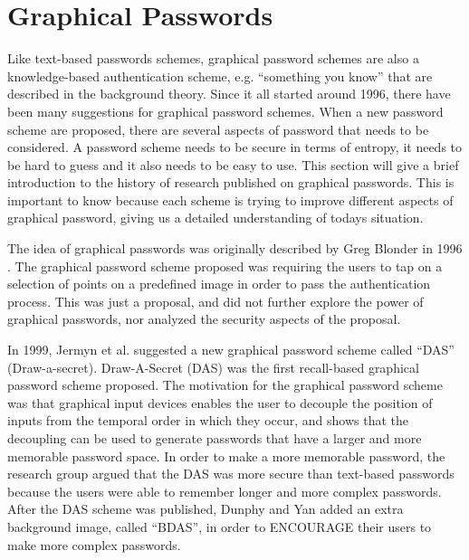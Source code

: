 \section{Graphical Passwords}


  Like text-based passwords schemes, graphical password schemes are also a knowledge-based authentication scheme, e.g. ``something you know'' that are described in the background theory. Since it all started around 1996, there have been many suggestions for graphical password schemes. When a new password scheme are proposed, there are several aspects of password that needs to be considered. A password scheme needs to be secure in terms of entropy, it needs to be hard to guess and it also needs to be easy to use. This section will give a brief introduction to the history of research published on graphical passwords. This is important to know because each scheme is trying to improve different aspects of graphical password, giving us a detailed understanding of todays situation. 

  The idea of graphical passwords was originally described by Greg Blonder in 1996 \cite{Blonder}. The graphical password scheme proposed was requiring the users to tap on a selection of points on a predefined image in order to pass the authentication process. This was just a proposal, and did not further explore the power of graphical passwords, nor analyzed the security aspects of the proposal. 

  In 1999, Jermyn et al. \cite{Jermyn} suggested a new graphical password scheme called ``DAS'' (Draw-a-secret). Draw-A-Secret (DAS) was the first recall-based graphical password scheme proposed. The motivation for the graphical password scheme was that graphical input devices enables the user to decouple the position of inputs from the temporal order in which they occur, and shows that the decoupling can be used to generate passwords that have a larger and more memorable password space. In order to make a more memorable password, the research group argued that the DAS was more secure than text-based passwords because the users were able to remember longer and more complex passwords. After the DAS scheme was published, Dunphy and Yan \cite{BDAS} added an extra background image, called ``BDAS'', in order to ENCOURAGE their users to make more complex passwords.

